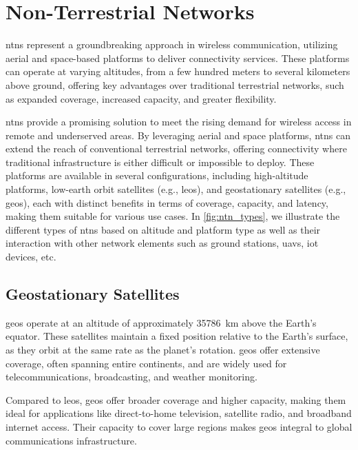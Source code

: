 \chapter{Non-Terrestrial Networks}
\label{ch:non_terrestrial_networks}

\glspl{ntn} represent a groundbreaking approach in wireless communication, utilizing aerial and space-based platforms to deliver connectivity services. These platforms can operate at varying altitudes, from a few hundred meters to several kilometers above ground, offering key advantages over traditional terrestrial networks, such as expanded coverage, increased capacity, and greater flexibility.

\glspl{ntn} provide a promising solution to meet the rising demand for wireless access in remote and underserved areas. By leveraging aerial and space platforms, \glspl{ntn} can extend the reach of conventional terrestrial networks, offering connectivity where traditional infrastructure is either difficult or impossible to deploy. These platforms are available in several configurations, including high-altitude platforms, low-earth orbit satellites (e.g., \glspl{leo}), and geostationary satellites (e.g., \glspl{geo}), each with distinct benefits in terms of coverage, capacity, and latency, making them suitable for various use cases. In \cref{fig:ntn_types}, we illustrate the different types of \glspl{ntn} based on altitude and platform type as well as their interaction with other network elements such as ground stations, \glspl{uav}, \gls{iot} devices, etc.

\section{Geostationary Satellites}

\glspl{geo} operate at an altitude of approximately \SI{35786}{\kilo\meter} above the Earth's equator. These satellites maintain a fixed position relative to the Earth’s surface, as they orbit at the same rate as the planet's rotation. \glspl{geo} offer extensive coverage, often spanning entire continents, and are widely used for telecommunications, broadcasting, and weather monitoring.

Compared to \glspl{leo}, \glspl{geo} offer broader coverage and higher capacity, making them ideal for applications like direct-to-home television, satellite radio, and broadband internet access. Their capacity to cover large regions makes \glspl{geo} integral to global communications infrastructure.

